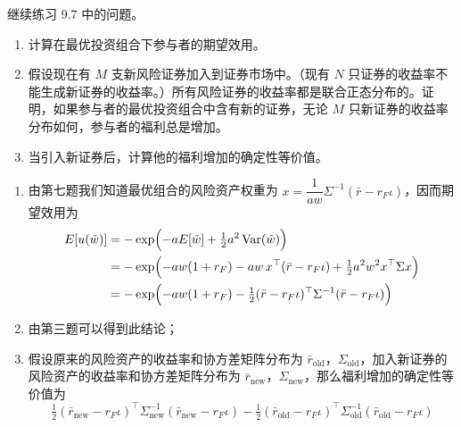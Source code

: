 \begin{problem}
 继续练习 9.7 中的问题。
\begin{enumerate}[label=(\alph*)]
    \item 计算在最优投资组合下参与者的期望效用。
    \item 假设现在有 $M$ 支新风险证券加入到证券市场中。（现有 $N$ 只证券的收益率不能生成新证券的收益率。）所有风险证券的收益率都是联合正态分布的。证明，如果参与者的最优投资组合中含有新的证券，无论 $M$ 只新证券的收益率分布如何，参与者的福利总是增加。
    \item 当引入新证券后，计算他的福利增加的确定性等价值。
\end{enumerate}
\end{problem}
\begin{solution}
\begin{enumerate}[label=(\alph*)]
    \item 由第七题我们知道最优组合的风险资产权重为 $x=\dfrac{1}{aw}\Sigma^{-1}(\bar{r}-r_{F}\iota)$，因而期望效用为
    \[
        \begin{aligned}
            E[u(\tilde{w})]
            &=-\exp\Bigl(-aE[\tilde{w}]+\tfrac12 a^{2}\operatorname{Var}(\tilde{w})\Bigr)\\
            &=-\exp\Bigl(-aw(1+r_{F})-aw\,x^{\top}(\bar{r}-r_{F}\iota)+\tfrac12 a^{2}w^{2}x^{\top}\Sigma x\Bigr)\\
            &=-\exp\Bigl(-aw(1+r_{F})-\tfrac12(\bar{r}-r_{F}\iota)^{\top}\Sigma^{-1}(\bar{r}-r_{F}\iota)\Bigr)
        \end{aligned}
    \]

    \item 由第三题可以得到此结论；

    \item 假设原来的风险资产的收益率和协方差矩阵分布为 $\bar{r}_{\mathrm{old}}$，$\Sigma_{\mathrm{old}}$，加入新证券的风险资产的收益率和协方差矩阵分布为 $\bar{r}_{\mathrm{new}}$，$\Sigma_{\mathrm{new}}$，那么福利增加的确定性等价值为
    \[
        \tfrac12(\bar{r}_{\mathrm{new}}-r_{F}\iota)^{\top}\Sigma_{\mathrm{new}}^{-1}(\bar{r}_{\mathrm{new}}-r_{F}\iota)-\tfrac12(\bar{r}_{\mathrm{old}}-r_{F}\iota)^{\top}\Sigma_{\mathrm{old}}^{-1}(\bar{r}_{\mathrm{old}}-r_{F}\iota)
    \]
\end{enumerate}
\end{solution}

